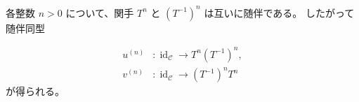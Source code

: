各整数 $n>0$ について、関手 $T^n$ と $(T^{-1})^n$ は互いに随伴である。
したがって随伴同型

\begin{equation}
  \begin{aligned}
    u^{(n)}&\colon\operatorname{id}_{\mathcal C}
      \longrightarrow T^n(T^{-1})^n,\\
    v^{(n)}&\colon\operatorname{id}_{\mathcal C}
      \longrightarrow (T^{-1})^nT^n
  \end{aligned}
  \tag{1.5.14.2}
\end{equation}
が得られる。
